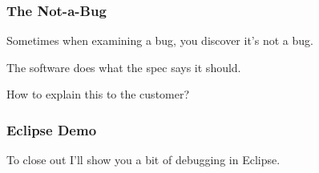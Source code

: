 \begin{frame}
\frametitle{The Not-a-Bug}
\begin{changemargin}{1cm}

Sometimes when examining a bug, you discover it's not a bug.

The software does what the spec says it should.

How to explain this to the customer?

\end{changemargin}
\end{frame}


\begin{frame}
\frametitle{Eclipse Demo}

\begin{changemargin}{1cm}

To close out I'll show you a bit of debugging in Eclipse.
\end{changemargin}

\end{frame}



